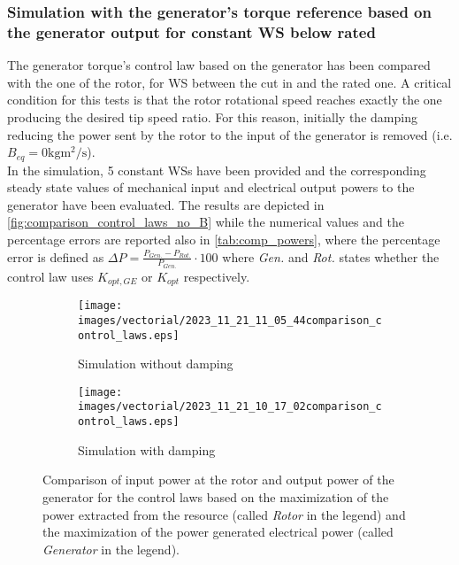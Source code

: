 \subsubsection{Simulation with the generator's torque reference based on the generator output for constant WS below rated}
The generator torque's control law based on the generator has been compared with the one of the rotor, for WS between the cut in and the rated one. A critical condition for this tests is that the rotor rotational speed reaches exactly the one producing the desired tip speed ratio. For this reason, initially the damping reducing the power sent by the rotor to the input of the generator is removed (i.e. $B_{eq}=0 \si{\kilo\gram\square\meter\per\second}$). \\
In the simulation, 5 constant WSs have been provided and the corresponding steady state values of mechanical input and electrical output powers to the generator have been evaluated. The results are depicted in \autoref{fig:comparison_control_laws_no_B} while the numerical values and the percentage errors are reported also in \autoref{tab:comp_powers}, where the percentage error is defined as $\Delta P = \frac{P_{Gen.} - P_{Rot.}}{P_{Gen.}}\cdot 100$ where  \textit{Gen.} and \textit{Rot.} states whether the control law uses $K_{opt,GE}$ or $K_{opt}$ respectively.

\begin{figure}[htb]
  \centering
  \begin{subfigure}{\columnwidth}
    \texttt{[image: images/vectorial/2023\_11\_21\_11\_05\_44comparison\_control\_laws.eps]}
    \caption{Simulation without damping}
    \label{fig:comparison_control_laws_no_B}
  \end{subfigure}
  \begin{subfigure}{\columnwidth}
    \texttt{[image: images/vectorial/2023\_11\_21\_10\_17\_02comparison\_control\_laws.eps]}
    \caption{Simulation with damping}
    \label{fig:comparison_control_laws_B}
  \end{subfigure}
  \caption{Comparison of input power at the rotor and output power of the generator for the control laws based on the maximization of the power extracted from the resource (called \textit{Rotor} in the legend) and the maximization of the power generated electrical power (called \textit{Generator} in the legend).}
  \label{fig:comparison_control_laws}
\end{figure}

